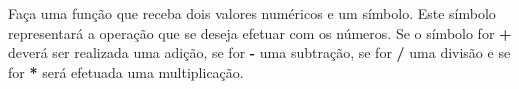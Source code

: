 
\question[10]

Faça uma função que receba dois valores numéricos e um símbolo. Este símbolo representará a operação que se deseja efetuar com os números. Se o símbolo for \textbf{+} deverá ser realizada uma adição, se for \textbf{-} uma subtração, se for \textbf{/} uma divisão e se for \textbf{*} será efetuada uma multiplicação.